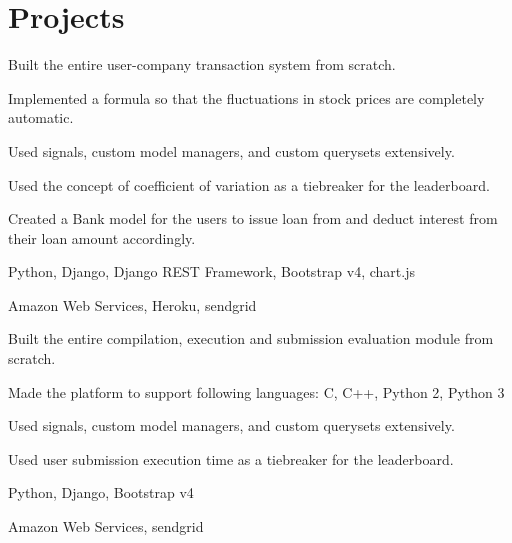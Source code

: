 
\section{Projects}

\begin{tightemize}
\item Built the entire user-company transaction system from scratch.
\item Implemented a formula so that the fluctuations in stock prices are completely automatic.
\item Used signals, custom model managers, and custom querysets extensively.
\item Used the concept of coefficient of variation as a tiebreaker for the leaderboard.
\item Created a Bank model for the users to issue loan from and deduct interest from their loan amount accordingly.
\item {} Python, Django, Django REST Framework, Bootstrap v4, chart.js
\item {} Amazon Web Services, Heroku, sendgrid
\end{tightemize}
\sectionsep

\begin{tightemize}
\item Built the entire compilation, execution and submission evaluation module from scratch.
\item Made the platform to support following languages: C, C++, Python 2, Python 3
\item Used signals, custom model managers, and custom querysets extensively.
\item Used user submission execution time as a tiebreaker for the leaderboard.
\item {} Python, Django, Bootstrap v4
\item {} Amazon Web Services, sendgrid
\end{tightemize}
\sectionsep

